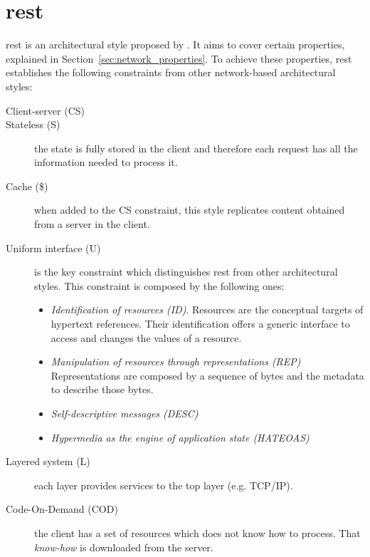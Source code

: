 
\section{\acl{rest}}
\label{sec:rest}

\acf{rest} is an architectural style proposed by \citet{fielding_architectural_2000}.
It aims to cover certain properties, explained in Section~\ref{sec:network_properties}.
To achieve these properties, \ac{rest} establishes the following constraints from other network-based architectural styles:
\begin{description}
 \item[Client-server (CS)]
 \item[Stateless (S)] the state is fully stored in the client and therefore each request has all the information needed to process it.
 \item[Cache (\$)] when added to the CS constraint, this style replicates content obtained from a server in the client.
 \item[Uniform interface (U)] is the key constraint which distinguishes \ac{rest} from other architectural styles.
                   This constraint is composed by the following ones:
    \begin{itemize}
	\item \emph{Identification of resources (ID)}.
		    Resources are the conceptual targets of hypertext references.
		    Their identification offers a generic interface to access and changes the values of a resource.
	\item \emph{Manipulation of resources through representations (REP)}
		    Representations are composed by a sequence of bytes and the metadata to describe those bytes.
	\item \emph{Self-descriptive messages (DESC)}
	\item \emph{Hypermedia as the engine of application state (HATEOAS)}
    \end{itemize}
 \item[Layered system (L)] each layer provides services to the top layer (e.g. TCP/IP). %
 \item[Code-On-Demand (COD)] the client has a set of resources which does not know how to process.
       That \emph{know-how} is downloaded from the server.
\end{description}


